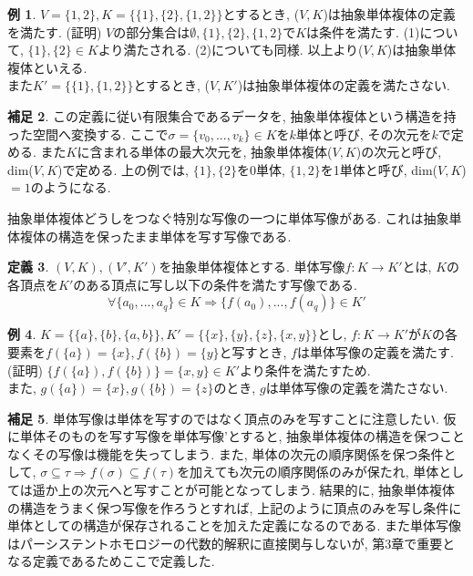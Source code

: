 \documentclass[a4paper]{jsarticle}
\theoremstyle{definition}
\newtheorem{dfn}{定義}[section]
\newtheorem{exam}[dfn]{例}
\newtheorem{hsk}[dfn]{補足}
\begin{document}
\begin{exam}
    $V=\{ 1, 2\}, K=\{\{1\}, \{2\}, \{1,2\} \}$とするとき, ($V,K$)は抽象単体複体の定義を満たす. (証明) $V$の部分集合は$\emptyset, \{1\}, \{2\}, \{1,2\}$で$K$は条件を満たす. (1)について, $\{1\}, \{2\}\in K$より満たされる. (2)についても同様. 以上より($V,K$)は抽象単体複体といえる. \\
    また$K'=\{\{1\}, \{1,2\} \}$とするとき, ($V,K'$)は抽象単体複体の定義を満たさない.
\end{exam}
\begin{hsk}
    この定義に従い有限集合であるデータを, 抽象単体複体という構造を持った空間へ変換する. ここで$\sigma=\{v_0,...,v_k\}\in K$を$k$単体と呼び, その次元を$k$で定める. また$K$に含まれる単体の最大次元を, 抽象単体複体($V,K$)の次元と呼び, dim($V,K$)で定める. 上の例では, $\{1\}, \{2\}$を0単体, $\{1,2\}$を1単体と呼び, dim($V,K$)$=1$のようになる.\\
\end{hsk}
抽象単体複体どうしをつなぐ特別な写像の一つに単体写像がある. これは抽象単体複体の構造を保ったまま単体を写す写像である.
\begin{dfn}
    $(V, K), (V', K')$を抽象単体複体とする. 単体写像$f:K\rightarrow K'$とは, $K$の各頂点を$K'$のある頂点に写し以下の条件を満たす写像である.
\begin{equation}
    \forall \{a_0,...,a_q\}\in K\Rightarrow \{f(a_0),...,f(a_q)\}\in K'
\end{equation}
\end{dfn}
\begin{exam}
    $K=\{ \{a\}, \{b\}, \{a,b\}\}, K'=\{ \{x\},\{y\}, \{z\}, \{x,y\}\}$とし, $f:K\rightarrow K'$が$K$の各要素を$f(\{a\})=\{x\}, f(\{b\})=\{y\}$と写すとき, $f$は単体写像の定義を満たす. (証明) $\{f(\{a\}), f(\{b\})\}=\{x,y\}\in K'$より条件を満たすため. \\
    また, $g(\{a\})=\{x\}, g(\{b\})=\{z\}$のとき, $g$は単体写像の定義を満たさない.
\end{exam}
\begin{hsk}
    単体写像は単体を写すのではなく頂点のみを写すことに注意したい. 仮に単体そのものを写す写像を単体写像'とすると, 抽象単体複体の構造を保つことなくその写像は機能を失ってしまう. また, 単体の次元の順序関係を保つ条件として, $\sigma\subseteq\tau \Rightarrow f(\sigma) \subseteq f(\tau)$を加えても次元の順序関係のみが保たれ, 単体としては遥か上の次元へと写すことが可能となってしまう. 結果的に, 抽象単体複体の構造をうまく保つ写像を作ろうとすれば, 上記のように頂点のみを写し条件に単体としての構造が保存されることを加えた定義になるのである. また単体写像はパーシステントホモロジーの代数的解釈に直接関与しないが, 第3章で重要となる定義であるためここで定義した.\\
\end{hsk}
\end{document}
